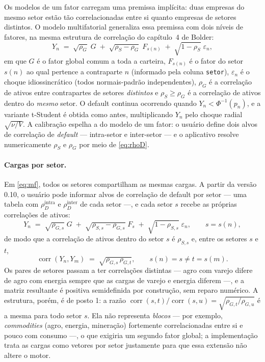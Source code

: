 \documentclass[11pt,a4paper]{article}
\begin{document}
Os modelos de um fator carregam uma premissa implícita: duas empresas do mesmo setor estão tão correlacionadas entre si quanto empresas de setores distintos. O modelo multifatorial generaliza essa premissa com dois níveis de fatores, na mesma estrutura de correlação do capítulo~4 de Bolder:
\begin{equation}
Y_n \;=\; \sqrt{\rho_G}\;G \;+\; \sqrt{\rho_S-\rho_G}\;F_{s(n)} \;+\; \sqrt{1-\rho_S}\;\varepsilon_n,
\label{eq:mf}
\end{equation}
em que $G$ é o fator global comum a toda a carteira, $F_{s(n)}$ é o fator do setor $s(n)$ ao qual pertence a contraparte $n$ (informado pela coluna \texttt{setor}), $\varepsilon_n$ é o choque idiossincrático (todos normais-padrão independentes), $\rho_G$ é a correlação de ativos entre contrapartes de setores \emph{distintos} e $\rho_S\ge\rho_G$ é a correlação de ativos dentro do \emph{mesmo} setor. O default continua ocorrendo quando $Y_n<\Phi^{-1}(p_n)$, e a variante t-Student é obtida como antes, multiplicando $Y_n$ pelo choque radial $\sqrt{\nu/V}$. A calibração espelha a do modelo de um fator: o usuário define dois alvos de correlação de \emph{default} --- intra-setor e inter-setor --- e o aplicativo resolve numericamente $\rho_S$ e $\rho_G$ por meio de \eqref{eq:rhoD}.

\paragraph{Cargas por setor.} Em \eqref{eq:mf}, todos os setores compartilham as mesmas cargas. A partir da versão 0.10, o usuário pode informar alvos de correlação de default por setor --- uma tabela com $\rho_D^{\mathrm{intra}}$ e $\rho_D^{\mathrm{inter}}$ de cada setor ---, e cada setor $s$ recebe as próprias correlações de ativos:
\begin{equation}
Y_n \;=\; \sqrt{\rho_{G,s}}\;G \;+\; \sqrt{\rho_{S,s}-\rho_{G,s}}\;F_{s} \;+\; \sqrt{1-\rho_{S,s}}\;\varepsilon_n,\qquad s=s(n),
\label{eq:mf-setor}
\end{equation}
de modo que a correlação de ativos dentro do setor $s$ é $\rho_{S,s}$ e, entre os setores $s$ e $t$,
\begin{equation}
\operatorname{corr}(Y_n,Y_m) \;=\; \sqrt{\rho_{G,s}\,\rho_{G,t}},\qquad s(n)=s\neq t=s(m).
\label{eq:mf-par}
\end{equation}
Os pares de setores passam a ter correlações distintas --- agro com varejo difere de agro com energia sempre que as cargas de varejo e energia diferem ---, e a matriz resultante é positiva semidefinida por construção, sem reparo numérico. A estrutura, porém, é de posto 1: a razão $\operatorname{corr}(s,t)/\operatorname{corr}(s,u)=\sqrt{\rho_{G,t}/\rho_{G,u}}$ é a mesma para todo setor $s$. Ela não representa \emph{blocos} --- por exemplo, \emph{commodities} (agro, energia, mineração) fortemente correlacionadas entre si e pouco com consumo ---, o que exigiria um segundo fator global; a implementação trata as cargas como vetores por setor justamente para que essa extensão não altere o motor.
\end{document}
